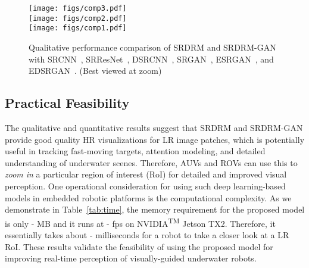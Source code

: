 \documentclass[10pt,twocolumn,letterpaper]{article}
\begin{document}
\begin{figure*}[t]
    \centering
    \texttt{[image: figs/comp3.pdf]}  \\
    \vspace{1mm}
    \texttt{[image: figs/comp2.pdf]}\\
    \vspace{1mm}
    \texttt{[image: figs/comp1.pdf]}\\
    \vspace{-1mm}
    \caption{Qualitative performance comparison of SRDRM and SRDRM-GAN with SRCNN~\cite{dong2015image}, SRResNet~\cite{ledig2017photo,yang2019deep},  DSRCNN~\cite{mao2016image}, 
    SRGAN~\cite{ledig2017photo}, 
    ESRGAN~\cite{wang2018esrgan}, and EDSRGAN~\cite{lim2017enhanced}. (Best viewed at  zoom)   
    }
    \vspace{-3mm}
    \label{fig:comp}
\end{figure*}



\subsection{Practical Feasibility}
The qualitative and quantitative results suggest that SRDRM and SRDRM-GAN provide good quality HR visualizations for LR image patches, which is potentially useful in tracking fast-moving targets, attention modeling, and detailed understanding of underwater scenes. Therefore, AUVs and ROVs can use this to \emph{zoom in} a particular region of interest (RoI) for detailed and improved visual perception. 
One operational consideration for using such deep learning-based models in embedded robotic platforms is the computational complexity. As we demonstrate in Table~\ref{tab:time}, the memory requirement for the proposed model is only - MB and it runs at - fps on NVIDIA\textsuperscript{TM} Jetson TX2. 
Therefore, it essentially takes about - milliseconds for a robot to take a closer look at a LR RoI.  
These results validate the feasibility of using the proposed model for improving real-time perception of visually-guided underwater robots. 
\end{document}

